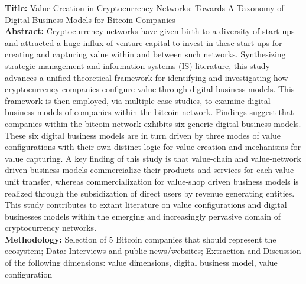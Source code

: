 \documentclass[a4paper, 12pt]{scrartcl}
\begin{document}
\textbf{Title:} Value Creation in Cryptocurrency Networks: Towards A Taxonomy of Digital Business Models for Bitcoin Companies \parencite{kazan2015value} \\
\textbf{Abstract:} Cryptocurrency networks have given birth to a diversity of start-ups and attracted a huge influx of
venture capital to invest in these start-ups for creating and capturing value within and between such
networks. Synthesizing strategic management and information systems (IS) literature, this study
advances a unified theoretical framework for identifying and investigating how cryptocurrency
companies configure value through digital business models. This framework is then employed, via
multiple case studies, to examine digital business models of companies within the bitcoin network.
Findings suggest that companies within the bitcoin network exhibits six generic digital business
models. These six digital business models are in turn driven by three modes of value configurations
with their own distinct logic for value creation and mechanisms for value capturing. A key finding of
this study is that value-chain and value-network driven business models commercialize their products
and services for each value unit transfer, whereas commercialization for value-shop driven business
models is realized through the subsidization of direct users by revenue generating entities. This study
contributes to extant literature on value configurations and digital businesses models within the
emerging and increasingly pervasive domain of cryptocurrency networks.\\
\textbf{Methodology:} Selection of 5 Bitcoin companies that should represent the ecosystem; Data: Interviews and public news/websites; Extraction and Discussion of the following dimensions: value dimensions, digital business model, value configuration
\end{document}
